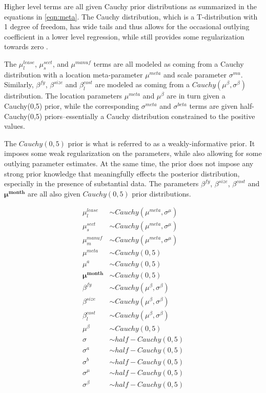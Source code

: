 \documentclass[a4paper]{article}
\begin{document}
Higher level terms are all given Cauchy prior distributions as summarized in the equations in \ref{eqn:meta}. The Cauchy distribution, which is a T-distribution with 1 degree of freedom, has wide tails and thus allows for the occasional outlying coefficient in a lower level regression, while still provides some regularization towards zero \citep{gelman_weakly_2008}.

The $\mu^{lease}_l$, $\mu^{sect}_s$, and $\mu^{manuf}$ terms are all
modeled as coming from a Cauchy distribution with a location meta-parameter $\mu^{meta}$ and scale parameter $\sigma^{mu}$. Similarly, $\beta^{fy}$, $\beta^{size}$ and $\beta^{cost}_l$ are modeled as coming from a $Cauchy(\mu^{\beta}, \sigma^{\beta})$ distribution. The location parameters $\mu^{meta}$ and $\mu^{\beta}$ are in turn given a Cauchy(0,5) prior, while the corresponding $\sigma^{meta}$ and $\sigma^{beta}$ terms are given half-Cauchy(0,5) priors--essentially a Cauchy distribution constrained to the positive values.

The $Cauchy(0,5)$ prior is what is referred to as a weakly-informative prior. It imposes some weak regularization on the parameters, while also allowing for some outlying parameter estimates. At the same time, the prior does not impose any strong prior knowledge that meaningfully effects the posterior distribution, especially in the presence of substantial data. The parameters $\beta^{fy}$, $\beta^{size}$, $\beta^{cost}$ and $\mathbf{\mu^{month}}$ are all also given $Cauchy(0,5)$ prior distributions.

\begin{equation}
\begin{aligned}
\mu^{lease}_l &\sim Cauchy(\mu^{meta}, \sigma^{\mu}) \\
\mu^{sect}_s &\sim Cauchy(\mu^{meta}, \sigma^{\mu}) \\
\mu^{manuf}_m &\sim Cauchy(\mu^{meta}, \sigma^{\mu}) \label{eqn:meta} \\
\mu^{meta} &\sim Cauchy(0, 5) \\
\mu^{a} &\sim Cauchy(0,5) \\
\mathbf{\mu^{month}} &\sim Cauchy(0,5) \\
\beta^{fy} &\sim Cauchy(\mu^{\beta}, \sigma^{\beta}) \\
\beta^{size} &\sim Cauchy(\mu^{\beta}, \sigma^{\beta})\\
\beta_l^{cost} &\sim Cauchy(\mu^{\beta}, \sigma^{\beta})\\
\mu^{\beta} &\sim Cauchy(0, 5) \\
\sigma &\sim half-Cauchy(0,5) \\
\sigma^{a} &\sim half-Cauchy(0,5) \\
\sigma^{b} &\sim half-Cauchy(0,5) \\
\sigma^{\mu} &\sim half-Cauchy(0,5)\\
\sigma^{\beta} &\sim half-Cauchy(0,5)\\
\end{aligned}
\end{equation}
\end{document}
